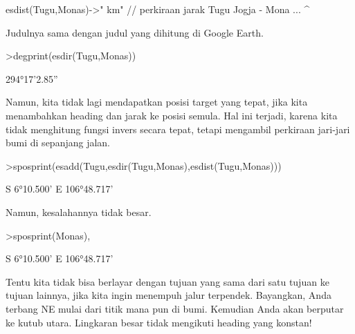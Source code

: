 \documentclass{article}
\begin{document}
\begin{eulernotebook}
\begin{eulercomment}
\begin{eulercomment}
\begin{eulercomment}
\begin{eulercomment}
\begin{euleroutput}
  esdist(Tugu,Monas)->" km" // perkiraan jarak Tugu Jogja - Mona ...
                           ^
\end{euleroutput}
\begin{eulercomment}
Judulnya sama dengan judul yang dihitung di Google Earth.
\end{eulercomment}
\begin{eulerprompt}
>degprint(esdir(Tugu,Monas))
\end{eulerprompt}
\begin{euleroutput}
  294°17'2.85''
\end{euleroutput}
\begin{eulercomment}
Namun, kita tidak lagi mendapatkan posisi target yang tepat, jika kita
menambahkan heading dan jarak ke posisi semula. Hal ini terjadi,
karena kita tidak menghitung fungsi invers secara tepat, tetapi
mengambil perkiraan jari-jari bumi di sepanjang jalan.
\end{eulercomment}
\begin{eulerprompt}
>sposprint(esadd(Tugu,esdir(Tugu,Monas),esdist(Tugu,Monas)))
\end{eulerprompt}
\begin{euleroutput}
  S 6°10.500' E 106°48.717'
\end{euleroutput}
\begin{eulercomment}
Namun, kesalahannya tidak besar.
\end{eulercomment}
\begin{eulerprompt}
>sposprint(Monas),
\end{eulerprompt}
\begin{euleroutput}
  S 6°10.500' E 106°48.717'
\end{euleroutput}
\begin{eulercomment}
Tentu kita tidak bisa berlayar dengan tujuan yang sama dari satu
tujuan ke tujuan lainnya, jika kita ingin menempuh jalur terpendek.
Bayangkan, Anda terbang NE mulai dari titik mana pun di bumi. Kemudian
Anda akan berputar ke kutub utara. Lingkaran besar tidak mengikuti
heading yang konstan!


\end{eulercomment}
\end{eulercomment}
\end{eulercomment}
\end{eulercomment}
\end{eulercomment}
\end{eulernotebook}
\end{document}
